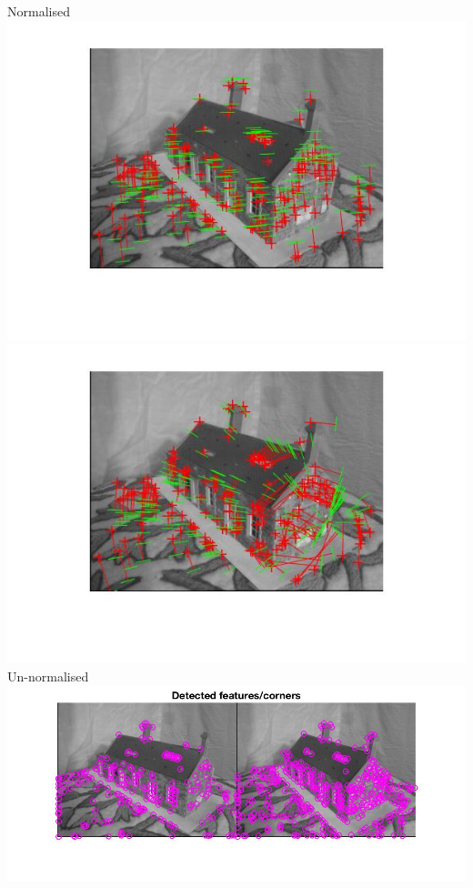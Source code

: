 \documentclass[a4paper,11pt]{article}
\begin{document}
Normalised\\
\includegraphics[width=\textwidth]{hw3/data/part2/2}\\
\vfill
\includegraphics[width=\textwidth]{hw3/data/part2/2_2}
Un-normalised\\
\includegraphics[width=\textwidth]{hw3/data/part2/4_1}\\
\end{document}
